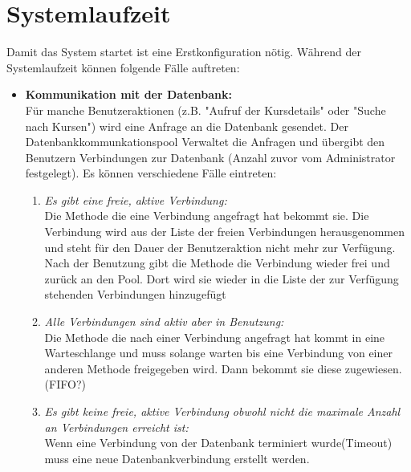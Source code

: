 \section{Systemlaufzeit}
		Damit das System startet ist eine Erstkonfiguration nötig. Während der Systemlaufzeit können folgende Fälle auftreten:
		\begin{itemize}
			\item \textbf{Kommunikation mit der Datenbank:}\\
			 Für manche Benutzeraktionen (z.B. "Aufruf der Kursdetails" oder "Suche nach Kursen") wird eine Anfrage an die Datenbank gesendet. Der Datenbankkommunkationspool Verwaltet die Anfragen und übergibt den Benutzern Verbindungen zur Datenbank (Anzahl zuvor vom Administrator festgelegt). Es können verschiedene Fälle eintreten:
			\begin{enumerate}
				\item \emph{Es gibt eine freie, aktive Verbindung:} \\
				Die Methode die eine Verbindung angefragt hat bekommt sie. Die Verbindung wird aus der Liste der freien Verbindungen herausgenommen und steht für den Dauer der Benutzeraktion nicht mehr zur Verfügung. Nach der Benutzung gibt die Methode die Verbindung wieder frei und zurück an den Pool. Dort wird sie wieder in die Liste der zur Verfügung stehenden Verbindungen hinzugefügt
				\item \emph{Alle Verbindungen sind aktiv aber in Benutzung:} \\
				Die Methode die nach einer Verbindung angefragt hat kommt in eine Warteschlange und muss solange warten bis eine Verbindung von einer anderen Methode freigegeben wird. Dann bekommt sie diese zugewiesen.(FIFO?)
				\item \emph{Es gibt keine freie, aktive Verbindung obwohl nicht die maximale Anzahl an Verbindungen erreicht ist:}\\
				 Wenn eine Verbindung von der Datenbank terminiert wurde(Timeout) muss eine neue Datenbankverbindung erstellt werden.
				
			\end{enumerate}
			

\end{itemize}
